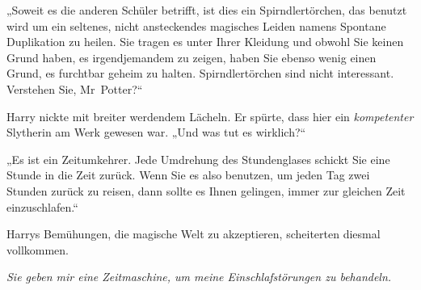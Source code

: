 „Soweit es die anderen Schüler betrifft, ist dies ein Spirndlertörchen, das benutzt wird um ein seltenes, nicht ansteckendes magisches Leiden namens Spontane Duplikation zu heilen. Sie tragen es unter Ihrer Kleidung und obwohl Sie keinen Grund haben, es irgendjemandem zu zeigen, haben Sie ebenso wenig einen Grund, es furchtbar geheim zu halten. Spirndlertörchen sind nicht interessant. Verstehen Sie, Mr~Potter?“%

Harry nickte mit breiter werdendem Lächeln. Er spürte, dass hier ein \emph{kompetenter} Slytherin am Werk gewesen war. „Und was tut es wirklich?“

„Es ist ein Zeitumkehrer. Jede Umdrehung des Stundenglases schickt Sie eine Stunde in die Zeit zurück. Wenn Sie es also benutzen, um jeden Tag zwei Stunden zurück zu reisen, dann sollte es Ihnen gelingen, immer zur gleichen Zeit einzuschlafen.“

Harrys Bemühungen, die magische Welt zu akzeptieren, scheiterten diesmal vollkommen.

\emph{Sie geben mir eine Zeitmaschine, um meine Einschlafstörungen zu behandeln.}

